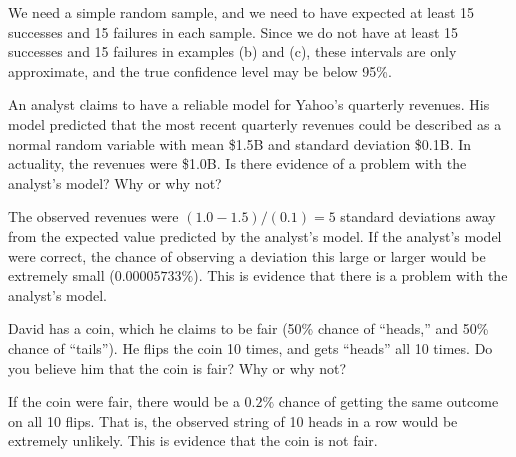 \documentclass[answers,11pt]{exam}
\begin{document}
\begin{questions}
\begin{solution}
We need a simple random sample, and we need to have expected at least 15
successes and 15 failures in each sample. Since we do not have at least 15
successes and 15 failures in examples (b) and (c), these intervals are only
approximate, and the true confidence level may be below 95\%.
\end{solution}


\newpage 



\question An analyst claims to have a reliable model for Yahoo's quarterly
revenues.  His model predicted that the most recent quarterly revenues could
be described as a normal random variable with mean \$1.5B and standard
deviation \$0.1B.  In actuality, the revenues were \$1.0B.  Is there evidence
of a problem with the analyst's model?  Why or why not?

\begin{solution}
The observed revenues were $(1.0 - 1.5) / (0.1) = 5$ standard deviations away
from the expected value predicted by the analyst's model.  If the analyst's
model were correct, the chance of observing a deviation this large or larger
would be extremely small ($0.00005733\%$).  This is evidence that there is a
problem with the analyst's model.
\end{solution}



\question David has a coin, which he claims to be fair (50\% chance of
``heads,'' and 50\% chance of ``tails'').  He flips the coin 10 times, and
gets ``heads'' all 10 times.  Do you believe him that the coin is fair?  Why
or why not?

\begin{solution}
If the coin were fair, there would be a $0.2\%$ chance of getting the same
outcome on all 10 flips.  That is, the observed string of 10 heads in a row
would be extremely unlikely.  This is evidence that the coin is not fair.
\end{solution}


\newpage 


\end{questions}
\end{document}
